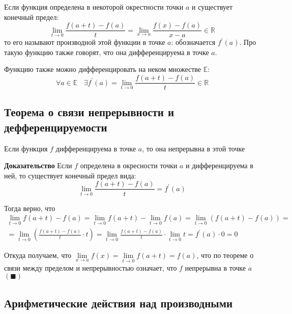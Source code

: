 \documentclass[class=article,a4paper,12pt,crop=false]{standalone}
\begin{document}
Если функция определена в некоторой окрестности точки $a$ и существует конечный предел:
\begin{equation}
    \lim\limits_{t \rightarrow 0}\frac{f(a + t) - f(a)}{t} =
    \lim\limits_{x \rightarrow a}\frac{f(x) - f(a)}{x - a} \in \mathbb{R}
\end{equation}
то его называют производной этой функции в точке $a$: обозначается $f^{'}(a)$.
Про такую функцию также говорят, что она дифференцируема в точке $a$.

Функцию также можно дифференцировать на неком множестве $\mathbb{E}$:
\begin{equation}
    \forall a \in \mathbb{E} \:\:\:\: \exists f^{'}(a) = \lim\limits_{t \rightarrow 0}\frac{f(a + t) - f(a)}{t} \in \mathbb{R}
\end{equation}

\subsection{Теорема о связи непрерывности и дефференцируемости}

Если функция $f$ дифференцируема в точке $a$, то она непрерывна в этой точке

\textbf{Доказательство} Если $f$ определена в окресности точки $a$ и дифференцируема в ней, то
существует конечный предел вида:
\begin{equation}
    \lim\limits_{t \rightarrow 0}\frac{f(a + t) - f(a)}{t} = f^{'}(a)
\end{equation}

Тогда верно, что
\begin{multline}
    \lim\limits_{t \rightarrow 0}f(a + t) - f(a) = 
    \lim\limits_{t \rightarrow 0}f(a + t) - \lim\limits_{t \rightarrow 0}f(a) =
    \lim\limits_{t \rightarrow 0}(f(a + t) - f(a)) = \\
    = \lim\limits_{t \rightarrow 0}(\frac{f(a + t) - f(a)}{t}\cdot{t}) = 
    \lim\limits_{t \rightarrow 0}\frac{f(a + t) - f(a)}{t}\cdot\lim\limits_{t \rightarrow 0}t =
    f^{'}(a)\cdot{0} = 0
\end{multline}

Откуда получаем, что $\lim\limits_{x \rightarrow a}f(x) = \lim\limits_{t \rightarrow 0}f(a + t) = f(a)$,
что по теореме о связи между пределом и непрерывностью означает, что $f$ непрерывна в точке $a$ $(\blacksquare)$

\subsection{Арифметические действия над производными}
\end{document}
